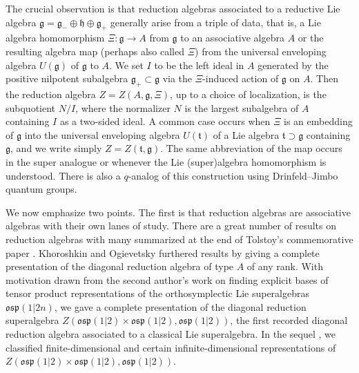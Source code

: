 \documentclass[10pt,a4paper]{amsart}
\numberwithin{equation}{section}
\begin{document}
The crucial observation is that reduction algebras associated to a reductive Lie algebra $\mathfrak{g} = \mathfrak{g}_{-} \oplus \mathfrak{h} \oplus \mathfrak{g}_{+}$ generally arise from a triple of data, that is, a Lie algebra homomorphism $\Xi\colon \mathfrak{g} \rightarrow A$ from $\mathfrak{g}$ to an associative algebra $A$ or the resulting algebra map (perhaps also called $\Xi$) from the universal enveloping algebra $U(\mathfrak{g})$ of $\mathfrak{g}$ to $A$. We set $I$ to be the left ideal in $A$ generated by the positive nilpotent subalgebra $\mathfrak{g}_{+} \subset \mathfrak{g}$ via the $\Xi$-induced action of $\mathfrak{g}$ on $A$. Then the reduction algebra $Z = Z(A,\mathfrak{g},\Xi)$, up to a choice of localization, is the subquotient $N/I$, where the normalizer $N$ is the largest subalgebra of $A$ containing $I$ as a two-sided ideal. A common case occurs when $\Xi$ is an embedding of $\mathfrak{g}$ into the universal enveloping algebra $U(\mathfrak{t})$ of a Lie algebra $\mathfrak{t} \supset \mathfrak{g}$ containing $\mathfrak{g}$, and we write simply $Z = Z(\mathfrak{t},\mathfrak{g})$. The same abbreviation of the map occurs in the super analogue or whenever the Lie (super)algebra homomorphism is understood. There is also a $q$-analog of this construction using Drinfeld--Jimbo quantum groups.

We now emphasize two points. The first is that reduction algebras are associative algebras with their own lanes of study. There are a great number of results on reduction algebras with many summarized at the end of Tolstoy's commemorative paper \cite{tolstoy2005fortieth}. Khoroshkin and Ogievetsky furthered results by giving a complete presentation of the diagonal reduction algebra \cite{khoroshkinDiagonalReductionAlgebras2010} of type $A$ of any rank.
With motivation drawn from the second author's work \cite{williamsii2020BasesInfinitedimensionalRepresentations,williamsii2024actionosp12npolytensor} on finding explicit bases of tensor product representations of the orthosymplectic Lie superalgebras~$\mathfrak{osp}(1|2n)$, we gave a complete presentation \cite[Section~3.5]{hartwigDiagonalReductionAlgebra2022c} of the diagonal reduction superalgebra $Z(\mathfrak{osp}(1|2) \times \mathfrak{osp}(1|2), \mathfrak{osp}(1|2))$, the first recorded diagonal reduction algebra associated to a classical \cite{kacClassificationSimpleLie1979} Lie superalgebra. In the sequel \cite{hartwigGhostCenterRepresentations2023}, we classified finite-dimensional and certain infinite-dimensional representations of $Z(\mathfrak{osp}(1|2) \times \mathfrak{osp}(1|2), \mathfrak{osp}(1|2))$.
\end{document}
